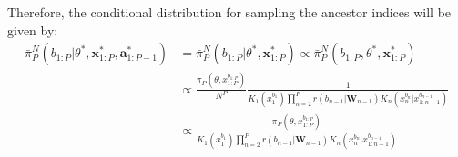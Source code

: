\documentclass[12pt,a4paper]{article}
\begin{document}
Therefore, the conditional distribution for sampling the ancestor indices will be given by: 
\begin{equation}
    \label{Eqn:MarginalBSi}
    \begin{split}
        \bar{\pi}_P^N\left(b_{1:P}|\theta^{*},\textbf{x}^{*}_{1:P},\textbf{a}^{*}_{1:P-1}\right) &= \bar{\pi}_P^N\left(b_{1:P}|\theta^{*},\textbf{x}^{*}_{1:P}\right) \propto \bar{\pi}_P^N\left(b_{1:P},\theta^{*},\textbf{x}^{*}_{1:P}\right)\\
        &\propto  \frac{\pi_P\left(\theta,x_{1:P}^{b_{1:P}}\right)}{N^P} \frac{1}{K_1\left(x_1^{b_1}\right)\prod_{n=2}^P r(b_{n-1}|\textbf{W}_{n-1}) K_n(x_n^{b_n}|x_{1:n-1}^{b_{n-1}})} \\
        & \propto \frac{\pi_P\left(\theta,x_{1:P}^{b_{1:P}}\right)}{K_1\left(x_1^{b_1}\right)\prod_{n=2}^P r(b_{n-1}|\textbf{W}_{n-1}) K_n(x_n^{b_n}|x_{1:n-1}^{b_{n-1}})}
    \end{split}
\end{equation}
\end{document}
